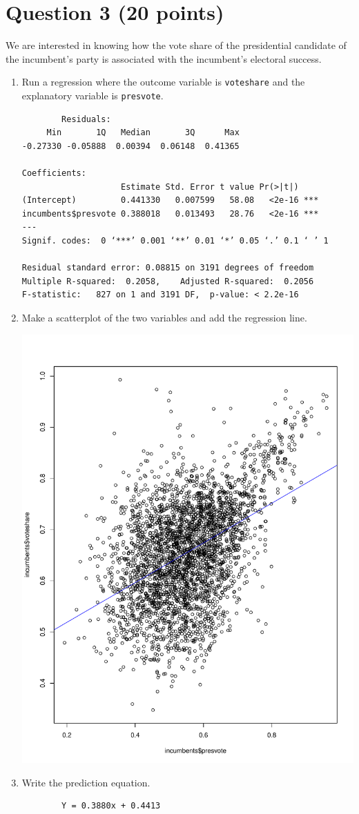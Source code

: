 \documentclass[12pt,letterpaper]{article}
\begin{document}
	\newpage	
\section*{Question 3 (20 points)}

\noindent We are interested in knowing how the vote share of the presidential candidate of the incumbent's party is associated with the incumbent's electoral success.
	\vspace{.25cm}
	\begin{enumerate}
		\item Run a regression where the outcome variable is \texttt{voteshare} and the explanatory variable is \texttt{presvote}.
			
			\begin{verbatim}
		Residuals:
     Min       1Q   Median       3Q      Max 
-0.27330 -0.05888  0.00394  0.06148  0.41365 

Coefficients:
                    Estimate Std. Error t value Pr(>|t|)    
(Intercept)         0.441330   0.007599   58.08   <2e-16 ***
incumbents$presvote 0.388018   0.013493   28.76   <2e-16 ***
---
Signif. codes:  0 ‘***’ 0.001 ‘**’ 0.01 ‘*’ 0.05 ‘.’ 0.1 ‘ ’ 1

Residual standard error: 0.08815 on 3191 degrees of freedom
Multiple R-squared:  0.2058,	Adjusted R-squared:  0.2056 
F-statistic:   827 on 1 and 3191 DF,  p-value: < 2.2e-16
			\end{verbatim}
			
		\item Make a scatterplot of the two variables and add the regression line. 
			
			\includegraphics[width=.75\textwidth]{plot_3.pdf}
			
		\item Write the prediction equation.
		\begin{verbatim}
		Y = 0.3880x + 0.4413
		\end{verbatim}
	\end{enumerate}
	
\end{document}
